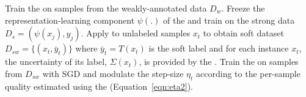 \setlength{\textfloatsep}{10pt}
\begin{algorithm}[t!]
\small
\caption{\fwlfull.}%
\begin{algorithmic}[1]
\label{alg:main}

\State Train the \std on samples from the weakly-annotated data $D_w$.
\medskip
\State Freeze the representation-learning component $\psi(.)$ of the \std and train \tch on the strong data $D_s={(\psi(x_j),y_j)}$. Apply \tch to unlabeled samples $x_t$ to obtain soft dataset $D_{sw}=\{(x_t, \bar{y}_t)\}$ where $\bar{y}_t=T(x_t)$ is the soft label and for each instance $x_t$, the uncertainty of its label, $\Sigma(x_t)$, is provided by the \tch.
\medskip
\State Train the \std on samples from $D_{sw}$ with SGD and modulate the step-size $\eta_t$ according to the per-sample quality estimated using the \tch (Equation~\ref{eqn:eta2}).
\end{algorithmic}
\end{algorithm}
